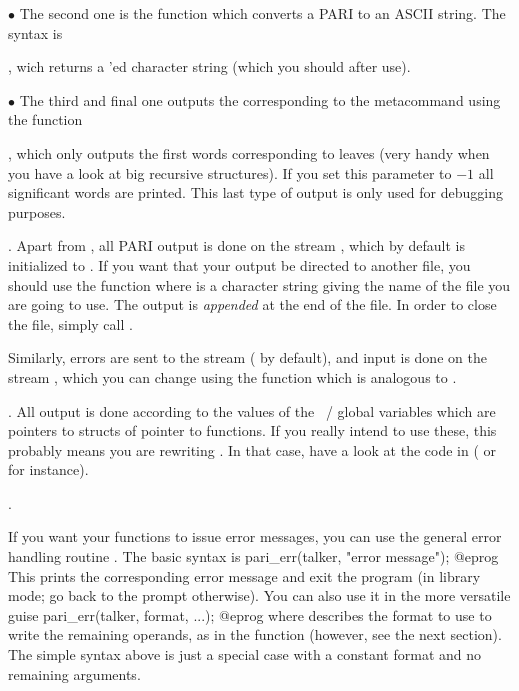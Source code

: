 \noindent $\bullet$ The second one is the function  which
converts a PARI  to an ASCII string. The syntax is

, wich returns a 'ed character
string (which you should  after use).

\noindent $\bullet$ The third and final one outputs the 
corresponding to the  metacommand  using the function

, which only outputs the first
 words corresponding to leaves (very handy when you have a look at
big recursive structures). If you set this parameter to $-1$ all significant
words are printed. This last type of output is only used for debugging purposes.

. Apart from , all PARI output is done on
the stream , which by default is initialized to . If
you want that your output be directed to another file, you should use the
function  where  is a
character string giving the name of the file you are going to use. The
output is \emph{appended} at the end of the file. In order to close
the file, simply call .

Similarly, errors are sent to the stream  (
by default), and input is done on the stream , which you can change
using the function  which is analogous to .

. All output is done according to the values
of the ~/  global variables which are pointers to
structs of pointer to functions. If you really intend to use these, this
probably means you are rewriting . In that case, have a look at the code in
 ( or  for instance).

.

\noindent
If you want your functions to issue error messages, you can use the general
error handling routine . The basic syntax is
%
\bprog
  pari_err(talker, "error message");
@eprog\noindent
This prints the corresponding error message and exit the program (in
library mode; go back to the  prompt otherwise).\label{se:err} You can
also use it in the more versatile guise
\bprog
  pari_err(talker, format, ...);
@eprog\noindent
where  describes the format to use to write the remaining
operands, as in the  function (however, see the next section).
The simple syntax above is just a special case with a constant format and no
remaining arguments.

